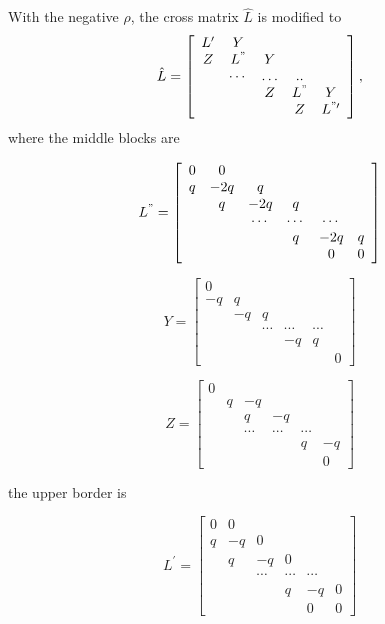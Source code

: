 \documentclass[12pt]{article}
\begin{document}
\begin{itemize}
    With the negative $\rho$, the cross matrix $\hat L$ is modified to
    \begin{equation}\label{eq: modified L_hat}
        \hat{L}=\left[\begin{array}{ccccc}L^{\prime} & Y & & & \\ Z & L^" & Y & & \\ & \cdots & \ldots & . . & \\ & & Z & L^" & Y \\ & & & Z & L^{"\prime }\end{array}\right],
    \end{equation}
    where the middle blocks are 
    
    \[
    L^" = \left[\begin{array}{cccccc}
    0 & 0 & & & & \\
    q & -2q & q & & & \\
    & q & -2q & q & & \\
    & & \cdots & \cdots & \cdots & \\
    & & & q & -2q & q \\
    & & & & 0 & 0
    \end{array}\right]
    \]
    
    \[
    Y = \left[\begin{array}{cccccc}
    0 & & & & & \\
    -q & q & & & & \\
    & -q & q & & & \\
    & & \cdots & \cdots & \cdots & \\
    & & & -q & q & \\
    & & & & & 0
    \end{array}\right]
    \]
    
    \[
    Z = \left[\begin{array}{cccccc}
    0 & & & & & \\
    & q & -q & & & \\
    & & q & -q & & \\
    & & \cdots & \cdots & \cdots & \\
    & & & & q & -q \\
    & & & & & 0
    \end{array}\right]
    \]

    the upper border is

    \[
    L^\prime = \left[\begin{array}{cccccc}
    0 & 0 & & & & \\
    q & -q & 0 & & & \\
    & q & -q & 0 & & \\
    & & \cdots & \cdots & \cdots & \\
    & & & q & -q & 0 \\
    & & & & 0 & 0
    \end{array}\right]
    \]


\end{itemize}
\end{document}
